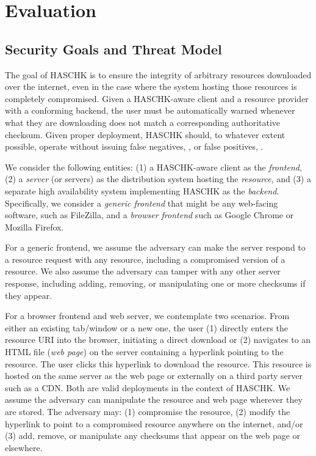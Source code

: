 \section{Evaluation} \label{sec:hc-evaluation}

\subsection{Security Goals and Threat Model}

The goal of HASCHK is to ensure the integrity of arbitrary resources
downloaded over the internet, even in the case where the system hosting those
resources is completely compromised. Given a HASCHK-aware client and a
resource provider with a conforming backend, the user must be automatically
warned whenever what they are downloading does not match a corresponding
authoritative checksum. Given proper deployment, HASCHK should, to whatever
extent possible, operate without issuing false negatives, , or false positives, .

We consider the following entities: (1) a HASCHK-aware client as the
\emph{frontend}, (2) a \emph{server} (or servers) as the distribution system
hosting the \emph{resource}, and (3) a separate high availability system
implementing HASCHK as the \emph{backend}. Specifically, we consider a
\emph{generic frontend} that might be any web-facing software, such as
FileZilla, and a \emph{browser frontend} such as Google Chrome or Mozilla
Firefox.

For a generic frontend, we assume the adversary can make the server respond to a
resource request with any resource, including a compromised version of a
resource. We also assume the adversary can tamper with any other server
response, including adding, removing, or manipulating one or more checksums if
they appear.

For a browser frontend and web server, we contemplate two scenarios. From either
an existing tab/window or a new one, the user (1) directly enters the resource
URI into the browser, initiating a direct download or (2) navigates to an HTML
file (\emph{web page}) on the server containing a hyperlink pointing to the
resource. The user clicks this hyperlink to download the resource. This resource
is hosted on the same server as the web page or externally on a third party
server such as a CDN. Both are valid deployments in the context of HASCHK. We
assume the adversary can manipulate the resource and web page wherever they are
stored. The adversary may: (1) compromise the resource, (2) modify the hyperlink
to point to a compromised resource anywhere on the internet, and/or (3) add,
remove, or manipulate any checksums that appear on the web page or elsewhere.

